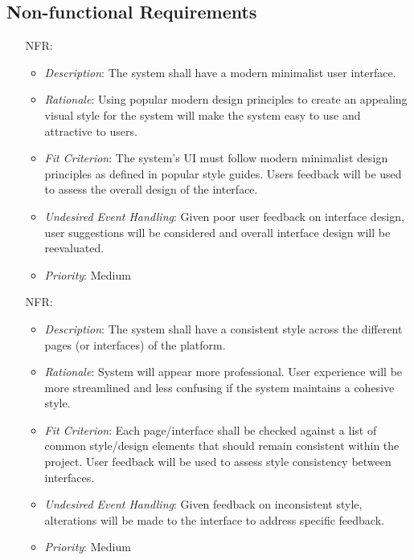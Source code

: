 \documentclass[12pt]{article}
\newcounter{nfrnum} %
\begin{document}
\subsection{Non-functional Requirements}

\noindent \begin{itemize}

\item[NFR\refstepcounter{nfrnum}\thenfrnum \label{NFR_1}:] 
\begin{itemize}
  \item \textit{Description}: The system shall have a modern minimalist user interface.
  \item \textit{Rationale}: Using popular modern design principles to create an appealing visual style for the system will make the system easy to use and attractive to users.
  \item \textit{Fit Criterion}: The system’s UI must follow modern minimalist design principles as defined in popular style guides. Users feedback will be used to assess the overall design of the interface. 
  \item \textit{Undesired Event Handling}: Given poor user feedback on interface design, user suggestions will be considered and overall interface design will be reevaluated. 
  \item \textit{Priority}: Medium
\end{itemize}


\item[NFR\refstepcounter{nfrnum}\thenfrnum \label{NFR_2}:] 
\begin{itemize}
  \item \textit{Description}: The system shall have a consistent style across the different pages (or interfaces) of the platform. 
  \item \textit{Rationale}: System will appear more professional. User experience will be more streamlined and less confusing if the system maintains a cohesive style. 
  \item \textit{Fit Criterion}: Each page/interface shall be checked against a list of common style/design elements that should remain consistent within the project. User feedback will be used to assess style consistency between interfaces. 
  \item \textit{Undesired Event Handling}: Given feedback on inconsistent style, alterations will be made to the interface to address specific feedback. 
  \item \textit{Priority}: Medium
\end{itemize}


\end{itemize}
\end{document}
